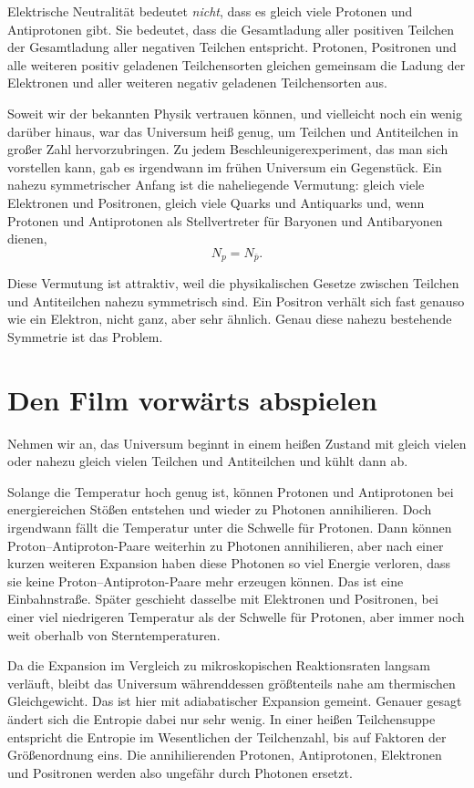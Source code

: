 Elektrische Neutralität bedeutet \emph{nicht}, dass es gleich viele Protonen und Antiprotonen gibt. Sie bedeutet, dass die Gesamtladung aller positiven Teilchen der Gesamtladung aller negativen Teilchen entspricht. Protonen, Positronen und alle weiteren positiv geladenen Teilchensorten gleichen gemeinsam die Ladung der Elektronen und aller weiteren negativ geladenen Teilchensorten aus.

Soweit wir der bekannten Physik vertrauen können, und vielleicht noch ein wenig darüber hinaus, war das Universum heiß genug, um Teilchen und Antiteilchen in großer Zahl hervorzubringen. Zu jedem Beschleunigerexperiment, das man sich vorstellen kann, gab es irgendwann im frühen Universum ein Gegenstück. Ein nahezu symmetrischer Anfang ist die naheliegende Vermutung: gleich viele Elektronen und Positronen, gleich viele Quarks und Antiquarks und, wenn Protonen und Antiprotonen als Stellvertreter für Baryonen und Antibaryonen dienen,
\[
N_p = N_{\bar p}.
\]

Diese Vermutung ist attraktiv, weil die physikalischen Gesetze zwischen Teilchen und Antiteilchen nahezu symmetrisch sind. Ein Positron verhält sich fast genauso wie ein Elektron, nicht ganz, aber sehr ähnlich. Genau diese nahezu bestehende Symmetrie ist das Problem.

\section{Den Film vorwärts abspielen}

Nehmen wir an, das Universum beginnt in einem heißen Zustand mit gleich vielen oder nahezu gleich vielen Teilchen und Antiteilchen und kühlt dann ab.

Solange die Temperatur hoch genug ist, können Protonen und Antiprotonen bei energiereichen Stößen entstehen und wieder zu Photonen annihilieren. Doch irgendwann fällt die Temperatur unter die Schwelle für Protonen. Dann können Proton--Antiproton-Paare weiterhin zu Photonen annihilieren, aber nach einer kurzen weiteren Expansion haben diese Photonen so viel Energie verloren, dass sie keine Proton--Antiproton-Paare mehr erzeugen können. Das ist eine Einbahnstraße. Später geschieht dasselbe mit Elektronen und Positronen, bei einer viel niedrigeren Temperatur als der Schwelle für Protonen, aber immer noch weit oberhalb von Sterntemperaturen.

Da die Expansion im Vergleich zu mikroskopischen Reaktionsraten langsam verläuft, bleibt das Universum währenddessen größtenteils nahe am thermischen Gleichgewicht. Das ist hier mit adiabatischer Expansion gemeint. Genauer gesagt ändert sich die Entropie dabei nur sehr wenig. In einer heißen Teilchensuppe entspricht die Entropie im Wesentlichen der Teilchenzahl, bis auf Faktoren der Größenordnung eins. Die annihilierenden Protonen, Antiprotonen, Elektronen und Positronen werden also ungefähr durch Photonen ersetzt.

